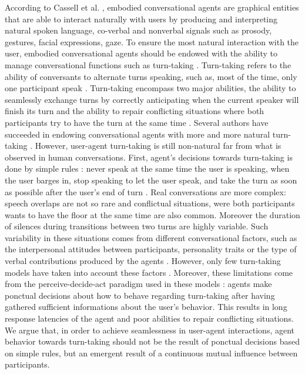 







According to Cassell et al. \cite{cassell_embodiment_1999}, embodied conversational agents are graphical entities that are able to interact naturally with users by producing and interpreting natural spoken language, co-verbal and nonverbal signals such as prosody, gestures, facial expressions, gaze. 
To ensure the most natural interaction with the user, embodied conversational agents should be endowed with the ability to manage conversational functions such as turn-taking \citep{cassell_embodiment_1999}. Turn-taking refers to the ability of conversants to alternate turns speaking, such as, most of the time, only one participant speak \citep{sacks_simplest_1974}. Turn-taking encompass two major abilities, the ability to seamlessly exchange turns by correctly anticipating when the current speaker will finish its turn and the ability to repair conflicting situations where both participants try to have the turn at the same time \citep{thorisson_natural_2002}. 
Several authors have succeeded in endowing conversational agents with more and more natural turn-taking \citep{thorisson_natural_2002,raux_optimizing_2012,jonsdottir_distributed_2013}. However, user-agent turn-taking is still non-natural far from what is observed in human conversations. First, agent's decisions towards turn-taking is done by simple rules : never speak at the same time the user is speaking, when the user barges in, stop speaking to let the user speak, and take the turn as soon as possible after the user's end of turn \citep{ter_maat_how_2010}. Real conversations are more complex: speech overlaps are not so rare and conflictual situations, were both participants wants to have the floor at the same time are also common. Moreover the duration of silences during transitions between two turns are highly variable. Such variability in these situations comes from different conversational factors, such as the interpersonal attitudes between participants, personality traits \citep{ter_maat_how_2010} or the type of verbal contributions produced by the agents \citep{cafaro_effects_2016}. However, only few turn-taking models have taken into account these factors \citep{lessmann_towards_2004,ravenet_conversational_2015}.
Moreover, these limitations come from the perceive-decide-act paradigm used in these models : agents make ponctual decisions about how to behave regarding turn-taking after having gathered sufficient informations about the user's behavior. This results in long response latencies of the agent and poor abilities to repair conflicting situations. We argue that, in order to achieve seamlessness in user-agent interactions, agent behavior towards turn-taking should not be the result of ponctual decisions based on simple rules, but an emergent result of a continuous mutual influence between participants. 

